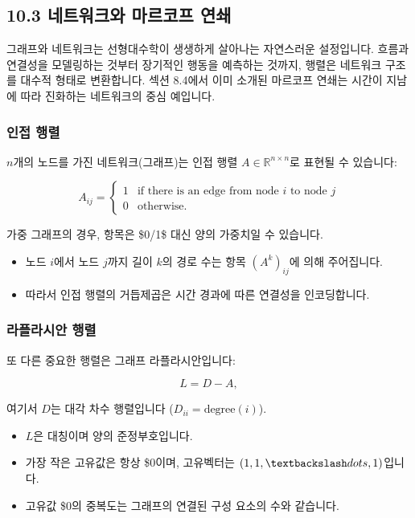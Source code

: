 \documentclass[
  12pt,
  a4paper,
]{article}
\begin{document}
\subsection{10.3 네트워크와 마르코프 연쇄}\label{103-networks-and-markov-chains}

그래프와 네트워크는 선형대수학이 생생하게 살아나는 자연스러운 설정입니다. 흐름과 연결성을 모델링하는 것부터 장기적인 행동을 예측하는 것까지, 행렬은 네트워크 구조를 대수적 형태로 변환합니다. 섹션 8.4에서 이미 소개된 마르코프 연쇄는 시간이 지남에 따라 진화하는 네트워크의 중심 예입니다.

\subsubsection{인접 행렬}\label{adjacency-matrices}

\(n\)개의 노드를 가진 네트워크(그래프)는 인접 행렬 \(A \in \mathbb{R}^{n \times n}\)로 표현될 수 있습니다:

\[A_{ij} =
\begin{cases}
1 & \text{if there is an edge from node \(i\) to node \(j\)} \\
0 & \text{otherwise.}
\end{cases}\]

가중 그래프의 경우, 항목은 \$0/1\$ 대신 양의 가중치일 수 있습니다.

\begin{itemize}
\item
  노드 \(i\)에서 노드 \(j\)까지 길이 \(k\)의 경로 수는 항목 \((A^k)_{ij}\)에 의해 주어집니다.
\item
  따라서 인접 행렬의 거듭제곱은 시간 경과에 따른 연결성을 인코딩합니다.
\end{itemize}

\subsubsection{라플라시안 행렬}\label{laplacian-matrices}

또 다른 중요한 행렬은 그래프 라플라시안입니다:

\[L = D - A,\]

여기서 \(D\)는 대각 차수 행렬입니다 (\(D_{ii} = \text{degree}(i)\)).

\begin{itemize}
\item
  \(L\)은 대칭이며 양의 준정부호입니다.
\item
  가장 작은 고유값은 항상 \$0\)이며, 고유벡터는 \((1,1,\textbackslash dots,1)\)입니다.
\item
  고유값 \$0\)의 중복도는 그래프의 연결된 구성 요소의 수와 같습니다.
\end{itemize}
\end{document}
